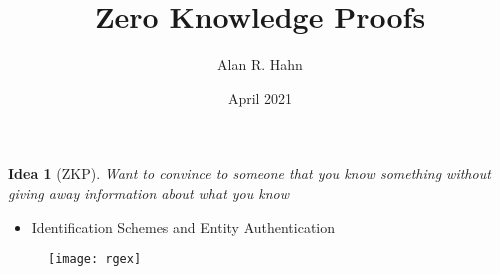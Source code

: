 \documentclass{beamer}
\title[Zero Knowledge Proofs]{Zero Knowledge Proofs}
\author{Alan R. Hahn}
\institute{Clemson University}
\date{April 2021}
\newtheorem{idea}{Idea}
\begin{document}
\begin{frame}
  \titlepage
\end{frame}

\begin{frame}
\begin{small}
\begin{idea}[ZKP]
Want to convince to someone that you know something without giving away information about what you know
\end{idea}

\pause
\begin{itemize}
\item Identification Schemes and Entity Authentication
\end{itemize}


\end{small}
\end{frame}

\begin{frame}
\begin{small}



\begin{figure}
\texttt{[image: rgex]}
\centering
\end{figure}


\end{small}
\end{frame}
\end{document}
